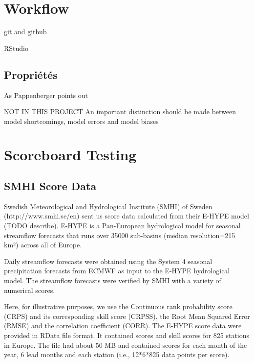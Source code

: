 \documentclass[logos,parttoc,morelanguage=french,morelanguage=italian]{orsay-memoire}
\begin{document}
\section{Workflow}



git and github

RStudio



\subsection{Propriétés}

As Pappenberger points out ~\cite{pappenberger2015know} 

NOT IN THIS PROJECT
An important distinction should be made between model shortcomings, model errors and model biases ~\cite{teutschbein2013bias}






\section{Scoreboard Testing}

\subsection{SMHI Score Data}

Swedish Meteorological and Hydrological Institute (SMHI) of Sweden (http://www.smhi.se/en) sent us score data calculated from their E-HYPE model (TODO describe). E-HYPE is a Pan-European hydrological model for seasonal streamflow forecasts that runs over 35000 sub-basins (median resolution=215 km²) across all of Europe.

Daily streamflow forecasts were obtained using the System 4 seasonal precipitation forecasts from ECMWF as input to the E-HYPE hydrological model. The streamflow forecasts were verified by SMHI with a variety of numerical scores.

Here, for illustrative purposes, we use the Continuous rank probability score (CRPS) and its corresponding skill score (CRPSS), the Root Mean Squared Error (RMSE) and the correlation coefficient (CORR). The E-HYPE score data were provided in RData file format. It contained scores and skill scores for 825 stations in Europe. The file had about 50 MB and contained scores for each month of the year, 6 lead months and each station (i.e., 12*6*825 data points per score).
\end{document}
